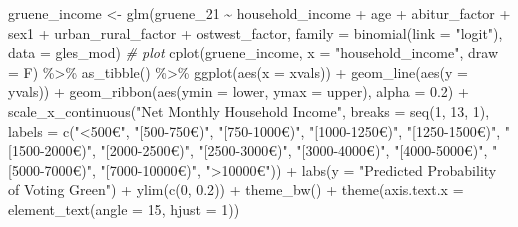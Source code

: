 \documentclass[
]{article}
\newenvironment{Shaded}{\begin{snugshade}}{\end{snugshade}}
\newcommand{\AttributeTok}[1]{\textcolor[rgb]{0.77,0.63,0.00}{#1}}
\newcommand{\CommentTok}[1]{\textcolor[rgb]{0.56,0.35,0.01}{\textit{#1}}}
\newcommand{\DecValTok}[1]{\textcolor[rgb]{0.00,0.00,0.81}{#1}}
\newcommand{\FloatTok}[1]{\textcolor[rgb]{0.00,0.00,0.81}{#1}}
\newcommand{\FunctionTok}[1]{\textcolor[rgb]{0.00,0.00,0.00}{#1}}
\newcommand{\NormalTok}[1]{#1}
\newcommand{\OtherTok}[1]{\textcolor[rgb]{0.56,0.35,0.01}{#1}}
\newcommand{\SpecialCharTok}[1]{\textcolor[rgb]{0.00,0.00,0.00}{#1}}
\newcommand{\StringTok}[1]{\textcolor[rgb]{0.31,0.60,0.02}{#1}}
\begin{document}
\begin{Shaded}
\begin{Highlighting}[]
\NormalTok{gruene\_income }\OtherTok{\textless{}{-}} \FunctionTok{glm}\NormalTok{(gruene\_21 }\SpecialCharTok{\textasciitilde{}}\NormalTok{ household\_income }\SpecialCharTok{+}\NormalTok{ age }\SpecialCharTok{+}\NormalTok{ abitur\_factor }\SpecialCharTok{+}\NormalTok{ sex1 }\SpecialCharTok{+}\NormalTok{ urban\_rural\_factor }\SpecialCharTok{+}\NormalTok{ ostwest\_factor, }\AttributeTok{family =} \FunctionTok{binomial}\NormalTok{(}\AttributeTok{link =} \StringTok{"logit"}\NormalTok{), }\AttributeTok{data =}\NormalTok{ gles\_mod)}
\CommentTok{\# plot }
\FunctionTok{cplot}\NormalTok{(gruene\_income, }\AttributeTok{x =} \StringTok{"household\_income"}\NormalTok{, }\AttributeTok{draw =}\NormalTok{ F) }\SpecialCharTok{\%\textgreater{}\%}
  \FunctionTok{as\_tibble}\NormalTok{() }\SpecialCharTok{\%\textgreater{}\%}
   \FunctionTok{ggplot}\NormalTok{(}\FunctionTok{aes}\NormalTok{(}\AttributeTok{x =}\NormalTok{ xvals)) }\SpecialCharTok{+}
   \FunctionTok{geom\_line}\NormalTok{(}\FunctionTok{aes}\NormalTok{(}\AttributeTok{y =}\NormalTok{ yvals)) }\SpecialCharTok{+}
   \FunctionTok{geom\_ribbon}\NormalTok{(}\FunctionTok{aes}\NormalTok{(}\AttributeTok{ymin =}\NormalTok{ lower, }\AttributeTok{ymax =}\NormalTok{ upper), }\AttributeTok{alpha =} \FloatTok{0.2}\NormalTok{) }\SpecialCharTok{+} 
   \FunctionTok{scale\_x\_continuous}\NormalTok{(}\StringTok{"Net Monthly Household Income"}\NormalTok{,}
                     \AttributeTok{breaks =} \FunctionTok{seq}\NormalTok{(}\DecValTok{1}\NormalTok{, }\DecValTok{13}\NormalTok{, }\DecValTok{1}\NormalTok{),}
                     \AttributeTok{labels =} \FunctionTok{c}\NormalTok{(}\StringTok{"\textless{}500€"}\NormalTok{, }\StringTok{"[500{-}750€)"}\NormalTok{,}
                                \StringTok{"[750{-}1000€)"}\NormalTok{, }\StringTok{"[1000{-}1250€)"}\NormalTok{, }
                                \StringTok{"[1250{-}1500€)"}\NormalTok{, }\StringTok{"[1500{-}2000€)"}\NormalTok{,}
                                \StringTok{"[2000{-}2500€)"}\NormalTok{, }\StringTok{"[2500{-}3000€)"}\NormalTok{,}
                                \StringTok{"[3000{-}4000€)"}\NormalTok{, }\StringTok{"[4000{-}5000€)"}\NormalTok{,}
                                \StringTok{"[5000{-}7000€)"}\NormalTok{, }\StringTok{"[7000{-}10000€)"}\NormalTok{,}
                                \StringTok{"\textgreater{}10000€"}\NormalTok{)) }\SpecialCharTok{+}
  \FunctionTok{labs}\NormalTok{(}\AttributeTok{y =} \StringTok{"Predicted Probability of Voting Green"}\NormalTok{) }\SpecialCharTok{+}
  \FunctionTok{ylim}\NormalTok{(}\FunctionTok{c}\NormalTok{(}\DecValTok{0}\NormalTok{, }\FloatTok{0.2}\NormalTok{)) }\SpecialCharTok{+}
  \FunctionTok{theme\_bw}\NormalTok{() }\SpecialCharTok{+}
  \FunctionTok{theme}\NormalTok{(}\AttributeTok{axis.text.x =} \FunctionTok{element\_text}\NormalTok{(}\AttributeTok{angle =} \DecValTok{15}\NormalTok{, }\AttributeTok{hjust =} \DecValTok{1}\NormalTok{))}
\end{Highlighting}
\end{Shaded}
\end{document}
